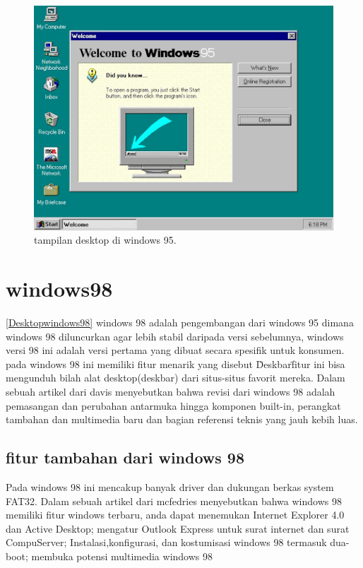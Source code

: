 \begin{figure}[ht]
\centerline{\includegraphics[width=1\textwidth]{figures/desktop95.PNG}}
\caption{tampilan desktop di windows 95.}
\label{desktop95}
\end{figure}

\section{windows98}
		\ref{Desktopwindows98}
	windows 98 adalah pengembangan dari windows 95 dimana windows 98 diluncurkan agar lebih stabil daripada versi sebelumnya, windows versi 98 ini adalah versi pertama yang dibuat secara spesifik untuk konsumen. pada windows 98 ini memiliki fitur menarik yang disebut \"Deskbar\" fitur ini bisa mengunduh bilah alat desktop(deskbar) dari situs-situs favorit mereka.
	Dalam sebuah artikel dari davis menyebutkan bahwa revisi dari windows 98 adalah pemasangan dan perubahan antarmuka hingga komponen built-in, perangkat tambahan dan multimedia baru dan bagian referensi teknis yang jauh kebih luas. \cite{Davis:1998:W9B:551711}
	\subsection{fitur tambahan dari windows 98}
			Pada windows 98 ini mencakup banyak driver dan dukungan berkas system FAT32.
		Dalam sebuah artikel dari mcfedries menyebutkan bahwa windows 98 memiliki fitur windows terbaru, anda dapat menemukan Internet Explorer 4.0 dan Active Desktop; mengatur Outlook Express untuk surat internet dan surat CompuServer; Instalasi,konfigurasi, dan kostumisasi windows 98 termasuk dua-boot; membuka potensi multimedia windows 98 \cite{mcfedries1998windows}

